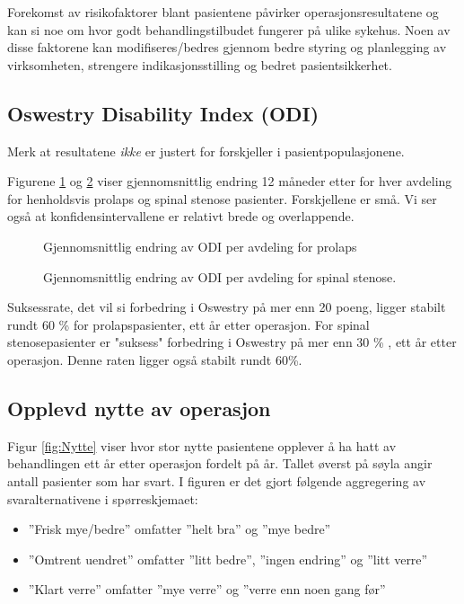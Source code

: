 \documentclass [norsk,a4paper,twoside]{article}\usepackage[]{graphicx}\usepackage[]{color}
\begin{document}
Forekomst av risikofaktorer blant pasientene påvirker operasjonsresultatene og kan
si noe om hvor godt behandlingstilbudet fungerer på ulike sykehus. Noen av disse
faktorene kan modifiseres/bedres gjennom bedre styring og planlegging av
virksomheten, strengere indikasjonsstilling og bedret pasientsikkerhet.





\subsection{Oswestry Disability Index (ODI)}

Merk at resultatene \textit{ikke} er justert for forskjeller i pasientpopulasjonene. 




Figurene \ref{fig:OswEndrAvdPro} og \ref{fig:OswEndrAvdSS} viser gjennomsnittlig endring 12 måneder etter for hver avdeling for henholdsvis prolaps og spinal stenose pasienter. Forskjellene er små. Vi ser også at konfidensintervallene er relativt brede og overlappende.

\begin{figure}[h] 
\caption{Gjennomsnittlig endring av ODI per avdeling for prolaps}
\label{fig:OswEndrAvdPro}
\end{figure}

\begin{figure}[h] 
\caption{Gjennomsnittlig endring av ODI per avdeling for spinal stenose.}
\label{fig:OswEndrAvdSS}
\end{figure}




Suksessrate, det vil si forbedring i Oswestry på mer enn 20 poeng, ligger stabilt rundt 60 \% for prolapspasienter, ett år etter operasjon. 
For spinal stenosepasienter er "suksess" forbedring i Oswestry på mer enn 30 \% , ett år etter operasjon. Denne raten ligger også stabilt rundt 60\%.


\clearpage


\subsection{Opplevd nytte av operasjon}

Figur \ref{fig:Nytte} viser hvor stor nytte pasientene opplever å ha hatt av behandlingen ett år etter operasjon fordelt på år. Tallet øverst på søyla angir antall pasienter som har svart. 
I figuren er det gjort følgende aggregering av svaralternativene i spørreskjemaet:
\begin{itemize}
\item ''Frisk mye/bedre'' omfatter ''helt bra'' og ''mye bedre'' 
\item ''Omtrent uendret'' omfatter ''litt bedre'', ''ingen endring'' og ''litt verre'' 
\item ''Klart verre'' omfatter ''mye verre'' og ''verre enn noen gang før''
\end{itemize}
\end{document}
